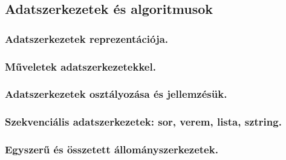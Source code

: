 \subsection{Adatszerkezetek és algoritmusok}
\subsubsection{Adatszerkezetek reprezentációja.}

\subsubsection{Műveletek adatszerkezetekkel.}

\subsubsection{Adatszerkezetek osztályozása és jellemzésük. }

\subsubsection{Szekvenciális adatszerkezetek: sor, verem, lista, sztring.}

\subsubsection{Egyszerű és összetett állományszerkezetek.}
